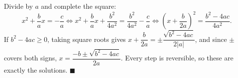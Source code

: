 Divide by $a$ and complete the square:
\[x^2+\dfrac bax=-\dfrac ca\iff x^2+\dfrac bax+\dfrac{b^2}{4a^2}=\dfrac{b^2}{4a^2}-\dfrac ca\iff\left(x+\dfrac b{2a}\right)^2=\dfrac{b^2-4ac}{4a^2}.\]
If $b^2-4ac\ge0$, taking square roots gives $x+\dfrac b{2a}=\pm\dfrac{\sqrt{b^2-4ac}}{2|a|}$, and since $\pm$ covers both signs, $x=\dfrac{-b\pm\sqrt{b^2-4ac}}{2a}$. Every step is reversible, so these are exactly the solutions. $\blacksquare$
